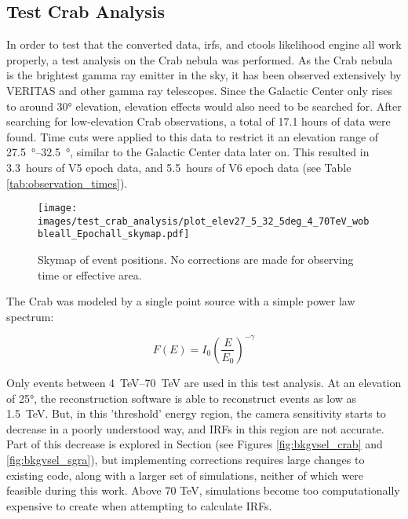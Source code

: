   \subsection{Test Crab Analysis}\label{subsec:crab_analysis}

    In order to test that the converted data, irfs, and ctools likelihood engine all work properly, a test analysis on the Crab nebula was performed.
    As the Crab nebula is the brightest gamma ray emitter in the sky, it has been observed extensively by VERITAS and other gamma ray telescopes.
    Since the Galactic Center only rises to around \ang{30} elevation, elevation effects would also need to be searched for.
    After searching for low-elevation Crab observations, a total of 17.1 hours of data were found.
    Time cuts were applied to this data to restrict it an elevation range of \SIrange{27.5}{32.5}{\degree}, similar to the Galactic Center data later on.
    This resulted in \SI{3.3}{hours} of V5 epoch data, and \SI{5.5}{hours} of V6 epoch data (see Table \ref{tab:observation_times}).
    
    \begin{figure}[h]
      \centering
      \texttt{[image: images/test\_crab\_analysis/plot\_elev27\_5\_32\_5deg\_4\_70TeV\_wobbleall\_Epochall\_skymap.pdf]}
      \caption[Crab Counts Skymap]
      {
        Skymap of event positions.
        No corrections are made for observing time or effective area.
      }
      \label{fig:crab_skymap}
    \end{figure}
    
    The Crab was modeled by a single point source with a simple power law spectrum:

    \begin{equation} \label{eqn:powerlaw}
    F\left( E \right) = I_{0} \left( \frac{E}{E_{0}} \right)^{-\gamma}
    \end{equation}

    Only events between \SIrange{4}{70}{TeV} are used in this test analysis.
    At an elevation of \ang{25}, the reconstruction software is able to reconstruct events as low as \SI{1.5}{TeV}.
    But, in this 'threshold' energy region, the camera sensitivity starts to decrease in a poorly understood way, and IRFs in this region are not accurate.
    Part of this decrease is explored in Section (see Figures \ref{fig:bkgvsel_crab} and \ref{fig:bkgvsel_sgra}), but implementing corrections requires large changes to existing code, along with a larger set of simulations, neither of which were feasible during this work.
    Above 70 TeV, simulations become too computationally expensive to create when attempting to calculate IRFs.
    
